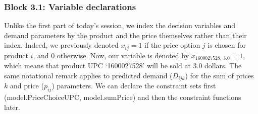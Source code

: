 \documentclass[letterpaper,10pt,english]{jupyterBook}
\begin{document}
\subsubsection{Block 3.1: Variable declarations}
\label{\detokenize{docs/Case1_5_Module2B_Retail_Price_Optimization_Script:block-3-1-variable-declarations}}
\sphinxAtStartPar
Unlike the first part of today’s session, we index the decision variables and demand parameters by the product and the price themselves rather than their index. Indeed, we previously denoted \(x_{ij}=1\) if the price option \(j\) is chosen for product \(i\), and 0 otherwise. Now, our variable is denoted by \(x_{1600027528,\ 3.0}=1\), which means that product UPC ‘1600027528’ will be sold at 3.0 dollars. The same notational remark applies to predicted demand (\(D_{ijk}\)) for the sum of prices \(k\) and price (\(p_{ij}\)) parameters. We can declare the constraint sets first (model.PriceChoiceUPC, model.sumPrice) and then  the constraint functions later.
\end{document}
